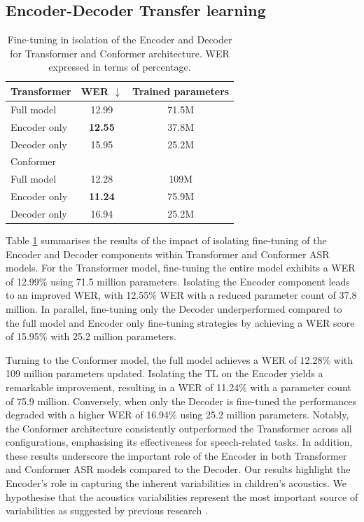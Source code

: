 \subsection{Encoder-Decoder Transfer learning}
\label{sec:ED_partial}
\begin{table}[h]
    \begin{center}
        \begin{tabular}{lcc}\hline
            Transformer    &   \ac{WER} $\downarrow$    & Trained parameters  \\ \hline
            Full model          & 12.99 & 71.5M   \\
            Encoder only & \textbf{12.55} & 37.8M  \\
            Decoder only & 15.95 & 25.2M  \\ \hline \hline
            Conformer    &    & \\ \hline
            Full model          & 12.28 & 109M   \\
            Encoder only & \textbf{11.24} & 75.9M  \\
            Decoder only & 16.94 & 25.2M  \\ \hline 

        \end{tabular}
    \end{center}
    \caption{Fine-tuning in isolation of the Encoder and Decoder for Transformer and Conformer architecture. WER expressed in terms of percentage.}
    \label{tab:EncoderDecoder}
\end{table}
Table \ref{tab:EncoderDecoder} summarises the results of the impact of isolating fine-tuning of the Encoder and Decoder components within Transformer and Conformer \ac{ASR} models. For the Transformer model, fine-tuning the entire model exhibits a \ac{WER} of 12.99\% using 71.5 million parameters. Isolating the Encoder component leads to an improved \ac{WER}, with 12.55\% \ac{WER} with a reduced parameter count of 37.8 million. In parallel, fine-tuning only the Decoder underperformed compared to the full model and Encoder only fine-tuning strategies by achieving a \ac{WER} score of 15.95\% with 25.2 million parameters.

Turning to the Conformer model, the full model achieves a \ac{WER} of 12.28\% with 109 million parameters updated. Isolating the \ac{TL} on the Encoder yields a remarkable improvement, resulting in a \ac{WER} of 11.24\% with a parameter count of 75.9 million. Conversely, when only the Decoder  is fine-tuned the performances degraded with a higher \ac{WER} of 16.94\% using 25.2 million parameters. Notably, the Conformer architecture consistently outperformed the Transformer across all configurations, emphasising its effectiveness for speech-related tasks. In addition, these results underscore the important role of the Encoder in both Transformer and Conformer \ac{ASR} models compared to the Decoder. Our results highlight the Encoder's role in capturing the inherent variabilities in children's acoustics. We hypothesise that the acoustics variabilities represent the most important source of variabilities as suggested by previous research \cite{TFchildren}.

